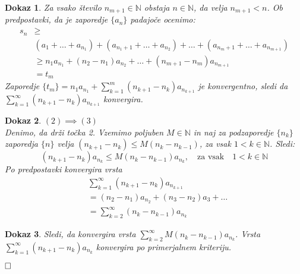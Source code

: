 \documentclass{beamer}
\def\qed{$\hfill\Box$}   %
\newtheorem{dokaz}{Dokaz}
\def\N{\mathbb{N}} %
\begin{document}
\begin{frame}
    \begin{dokaz}
        Za vsako število $n_{m + 1} \in \N$ obstaja $n \in \N$, da velja $n_{m + 1} < n$.
        \pause
        Ob predpostavki, da je zaporedje $\{a_n\}$ padajoče ocenimo:
        \[
            \begin{split}
                s_n & \geq \\
                & (a_1 + \ldots + a_{n_1}) + (a_{n_{1} + 1} + \ldots + a_{n_2}) + \ldots + (a_{n_{m} + 1} + \ldots + a_{n_{m+1}})\\
                & \geq n_1a_{n_1} + (n_2 - n_1)a_{n_2} + \ldots + (n_{m + 1} - n_{m})a_{n_{m+ 1}}\\
                & = t_m
            \end{split}
        \]
        \pause
        Zaporedje $\{t_m\}  = n_1a_{n_1} + \sum_{k = 1}^{m}{(n_{k+1} - n_k)a_{n_{k + 1}}}$ je konvergentno, sledi
        da $\sum_{k = 1}^{\infty}{(n_{k+1} - n_k)a_{n_{k + 1}}}$ konvergira.
    \end{dokaz}
\end{frame}
\begin{frame}
    \begin{dokaz}
        $(2) \implies (3)$\\
        Denimo, da drži točka 2.
        Vzemimo poljuben $M \in \N$ in naj za podzaporedje $\{n_k\}$ zaporedja $\{n\}$ velja
        $ (n_{k+1} - n_k) \leq M(n_k - n_{k - 1})$, za vsak $ 1 < k \in \N$.
        \pause
        Sledi:
        \[
            (n_{k+1} - n_k)a_{n_k} \leq M(n_k - n_{k - 1})a_{n_k}, \quad \text{za vsak} \quad  1 < k \in \N
        \]
        \pause
        Po predpostavki konvergira vrsta
        \[
            \begin{split}
            & \sum_{k = 1}^{\infty}{(n_{k+1} - n_k)a_{n_{k + 1}}}\\
            & = (n_2 -n_1)a_{n_2} + (n_3 - n_2)a_3 + \ldots \\
            & = \sum_{k = 2}^{\infty}{(n_k - n_{k - 1})a_{n_k}}
            \end{split}
        \]
    \end{dokaz}
\end{frame}
\begin{frame}
    \begin{dokaz}
        Sledi, da konvergira vrsta $\sum_{k = 2}^{\infty}{M(n_k - n_{k - 1})a_{n_k}}$.
        \pause
        Vrsta $\sum_{k = 1}^{\infty}{(n_{k+1} - n_k)a_{n_{k}}}$ konvergira po primerjalnem kriteriju.

        \qed
    \end{dokaz}
\end{frame}
\end{document}
